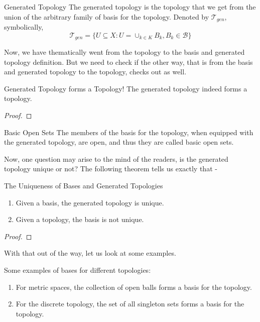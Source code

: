 \begin{Definition}{Generated Topology}\label{generated_topology}
    The generated topology is the topology that we get from the union of the arbitrary family of basis for the topology. Denoted by $\mathcal{T}_{gen}$, symbolically, $$\mathcal{T}_{gen}=\{U\subseteq X:U=\cup_{k\in K}B_k,B_k\in\mathcal{B}\}$$
\end{Definition}
\noindent Now, we have thematically went from the topology to the basis and generated topology definition. But we need to check if the other way, that is from the basis and generated topology to the topology, checks out as well.
\begin{Theorem}{Generated Topology forms a Topology!}\label{generated_topology_forms_a_topology}
	The generated topology indeed forms a topology.
\end{Theorem}
\begin{proof}
	
\end{proof}
\begin{Definition}{Basic Open Sets}\label{basic_open_set}
    The members of the basis for the topology, when equipped with the generated topology, are open, and thus they are called basic open sets.
\end{Definition}
\noindent Now, one question may arise to the mind of the readers, is the generated topology unique or not? The following theorem tells us exactly that -
\begin{Theorem}{The Uniqueness of Bases and Generated Topologies}\label{uniqueness_of_bases_and_generated_topologies}
	\begin{enumerate}[leftmargin=0.5cm]
		\item Given a basis, the generated topology is unique.
		\item Given a topology, the basis is not unique.
	\end{enumerate}
\end{Theorem}
\begin{proof}
	
\end{proof}
\noindent With that out of the way, let us look at some examples.
\begin{Example}
    Some examples of bases for different topologies:
    \begin{enumerate}
        \item For metric spaces, the collection of open balls forms a basis for the topology.
        \item For the discrete topology, the set of all singleton sets forms a basis for the topology.
    \end{enumerate}
\end{Example}
